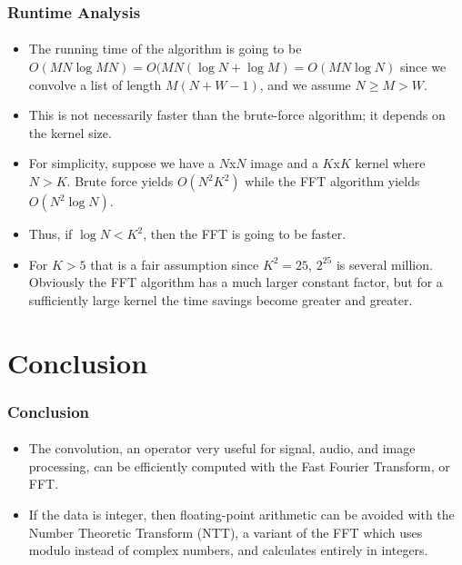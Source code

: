 \documentclass{beamer}                             %
\begin{document}
\begin{frame}
\frametitle{Runtime Analysis}
\framesubtitle{}
\begin{itemize}[<+->]
  \item The running time of the algorithm is going to be \( O(MN \log MN) =
    O(MN(\log N + \log M) = O(MN \log N) \) since we convolve a list
    of length \( M(N + W - 1) \), and we assume \( N \geq M > W \).
  \item This is not necessarily faster than the
    brute-force algorithm; it depends on the kernel size.
  \item For simplicity, suppose we have a \( N \)x\( N \) image and
    a \( K \)x\( K \) kernel where \( N > K \). Brute force yields \(
    O(N^2 K^2) \) while the FFT algorithm yields \( O(N^2 \log N) \).
  \item Thus, if \( \log N < K^2 \), then the FFT is going to be
    faster. \item For \( K > 5 \) that is a fair assumption since \( K^2 =
    25 \), \( 2^{25} \) is several million. Obviously the FFT algorithm has
    a much larger constant factor, but for a sufficiently large kernel the
    time savings become greater and greater.
\end{itemize}
\end{frame}

\section{Conclusion}

\begin{frame}
\frametitle{Conclusion}
\framesubtitle{}
\begin{itemize}[<+->]
  \item The convolution, an operator very useful for
    signal, audio, and image processing, can be efficiently
    computed with the Fast Fourier Transform, or FFT.
  \item If the data is integer, then floating-point arithmetic can be avoided
    with the Number Theoretic Transform (NTT), a variant of the FFT which uses
    modulo instead of complex numbers, and calculates entirely in integers.
\end{itemize}
\end{frame}
\end{document}
